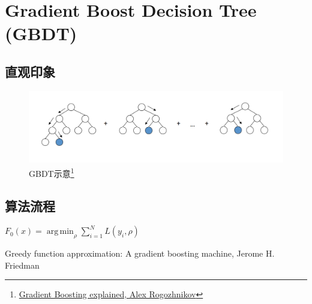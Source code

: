 
\section{Gradient Boost Decision Tree (GBDT)}
\subsection{直观印象}
\begin{frame}
    \begin{figure}[!tb]
        \includegraphics[width=1.2\onepicwidth]{figure/gbdt/gbdt_attractive_picture}
        \caption{GBDT示意\footnote{
                 \href{http://arogozhnikov.github.io/2016/06/24/gradient_boosting_explained.html}{Gradient Boosting explained, Alex Rogozhnikov}}}
    \end{figure}
\end{frame}


\subsection{算法流程}
\begin{frame}
    \begin{algorithm}[H]
        $F_0(x) = \operatorname{arg \, min}_\rho \sum_{i=1}^N L(y_i, \rho)$ \;
        \caption{Gradient\_Boost}
    \end{algorithm}
    {\tiny Greedy function approximation: A gradient boosting machine, Jerome H. Friedman}
\end{frame}


